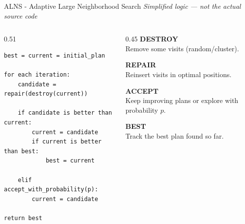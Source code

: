 \begin{frame}[fragile]{ALNS - Adaptive Large Neighborhood Search}
\textit{Simplified logic — not the actual source code}

\vspace{0.15cm}
\begin{columns}[T,onlytextwidth]
\begin{column}{0.51\textwidth}
\begin{block}{}
\scriptsize
\begin{verbatim}
best = current = initial_plan

for each iteration:
    candidate = repair(destroy(current))

    if candidate is better than current:
        current = candidate
        if current is better than best:
            best = current

    elif accept_with_probability(p):
        current = candidate

return best
\end{verbatim}
\end{block}
\end{column}

\begin{column}{0.45\textwidth}
\vspace{0.2cm}
\footnotesize
\textbf{DESTROY}\\
Remove some visits (random/cluster).

\vspace{0.3cm}
\textbf{REPAIR}\\
Reinsert visits in optimal positions.

\vspace{0.3cm}
\textbf{ACCEPT}\\
Keep improving plans or explore with probability $p$.

\vspace{0.3cm}
\textbf{BEST}\\
Track the best plan found so far.
\end{column}
\end{columns}
\end{frame}
